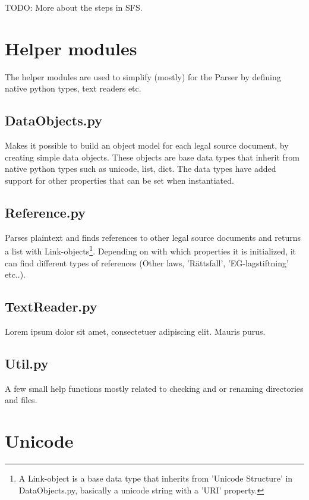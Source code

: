 \documentclass[a4paper,11pt]{kth-mag}
\begin{document}
TODO: More about the steps in SFS. 

\section{Helper modules}

The helper modules are used to simplify (mostly) for the Parser by defining native python types, text readers etc.  

\subsection{DataObjects.py}

Makes it possible to build an object model for each legal source document, by
creating simple data objects. These objects are base data types that inherit
from native python types such as unicode, list, dict. The data types have
added support for other properties that can be set when instantiated.

\subsection{Reference.py}

Parses plaintext and finds references to other legal source documents and
returns a list with Link-objects\footnote{A Link-object is a base data type
that inherits from 'Unicode Structure' in DataObjects.py, basically a unicode
string with a 'URI' property.}. Depending on with which properties it is
initialized, it can find different types of references (Other laws,
'Rättsfall', 'EG-lagstiftning' etc..).

\subsection{TextReader.py}

Lorem ipsum dolor sit amet, consectetuer adipiscing elit. Mauris
purus. 

\subsection{Util.py}

A few small help functions mostly related to checking and or renaming directories and files. 

\section{Unicode}
\end{document}
